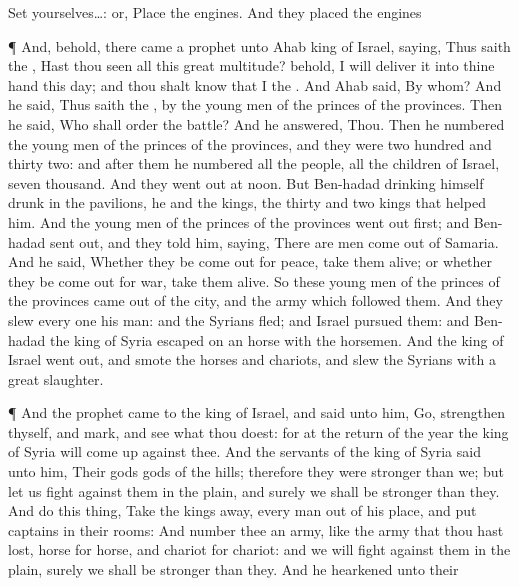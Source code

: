 {{Set yourselves…: or, Place the engines. And they placed the engines}
\par }{\PP {}¶ And, behold, there
came
a
prophet unto
Ahab
king of
Israel,
saying, Thus
saith the
{}, Hast thou
seen all this
great
multitude? behold, I will
deliver it into thine
hand this
day; and thou shalt
know that I
{} the
{}.
And
Ahab
said, By whom? And he
said, Thus
saith the
{},
{} by the young
men of the
princes of the
provinces. Then he
said, Who shall
order the
battle? And he
answered, Thou.
Then he
numbered the young
men of the
princes of the
provinces, and they were
two
hundred and
thirty
two: and
after them he
numbered all the
people,
{} all the
children of
Israel,
{}
seven
thousand.
And they went
out at
noon. But
Ben-hadad
{}
drinking himself
drunk in the
pavilions, he and the
kings, the
thirty and
two
kings that
helped him.
And the young
men of the
princes of the
provinces went
out
first; and
Ben-hadad sent
out, and they
told him,
saying, There are
men come
out of
Samaria.
And he
said, Whether they be come
out for
peace,
take them
alive; or whether they be come
out for
war,
take them
alive.
So these young
men of the
princes of the
provinces came
out of the
city, and the
army which
followed them.
And they
slew every
one his
man: and the
Syrians
fled; and
Israel
pursued them: and
Ben-hadad the
king of
Syria
escaped on an
horse with the
horsemen.
And the
king of
Israel went
out, and
smote the
horses and
chariots, and
slew the
Syrians with a
great
slaughter.
\par }{\PP {}¶ And the
prophet
came to the
king of
Israel, and
said unto him,
Go,
strengthen thyself, and
mark, and
see what thou
doest: for at the
return of the
year the
king of
Syria will come
up against thee.
And the
servants of the
king of
Syria
said unto him, Their
gods
{}
gods of the
hills; therefore they were
stronger than we;
but let us
fight against them in the
plain, and
surely we shall be
stronger than they.
And
do this
thing,
Take the
kings away, every
man out of his
place, and
put
captains in their rooms:
And
number thee an
army, like the
army that thou hast
lost,
horse for
horse, and
chariot for
chariot: and we will
fight
against them in the
plain,
{} surely we shall be
stronger than they. And he
hearkened unto their
}
